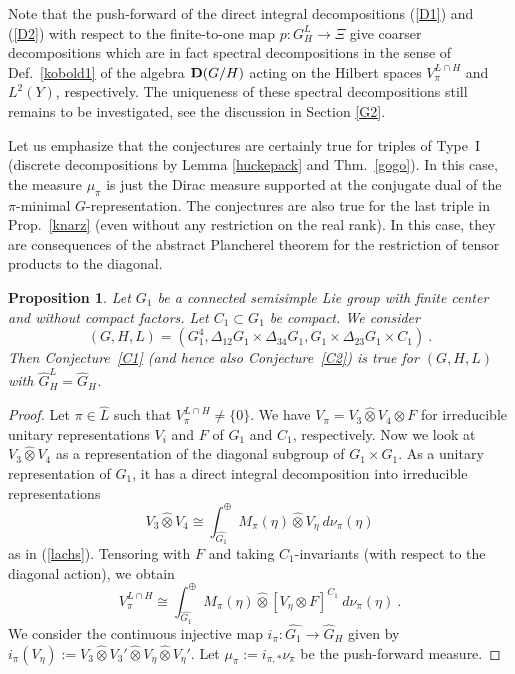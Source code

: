 \documentclass[10]{amsart}
\newtheorem{pro}[thm]{Proposition}
\theoremstyle{remark}
\theoremstyle{definition}
\numberwithin{equation}{section}
\newcommand{\be}{\begin{equation}}
\begin{document}
{Note that the push-forward of the direct integral decompositions (\ref{D1}) and (\ref{D2}) with respect to the  finite-to-one map $p: G_H^L\rightarrow \Xi$ give coarser decompositions
which are in fact spectral decompositions in the sense of Def.~\ref{kobold1} of the algebra ${\bf D}(G/H)$ acting on the Hilbert spaces  $V_\pi^{L\cap H}$ and $L^2(Y)$, respectively.
The uniqueness of these spectral decompositions still remains to be investigated, see the discussion in Section \ref{G2}.

Let us emphasize that the conjectures are certainly true for triples of Type~I (discrete decompositions by Lemma \ref{huckepack} and Thm.~\ref{gogo}).
In this case, the measure $\mu_\pi$ is just the Dirac measure supported at the conjugate dual of the $\pi$-minimal $G$-representation.
The conjectures are also true for the last triple in Prop.~\ref{knarz} (even without any restriction on the real rank). In this case, they are consequences of the abstract Plancherel theorem for the restriction of tensor products to the diagonal.

\begin{pro}\label{last}
Let $G_1$ be a connected semisimple Lie group with finite center and without compact factors. Let $C_1\subset G_1$ be compact. We consider 
$$ (G,H,L)=(G_1^4,\Delta_{12}G_1\times\Delta_{34}G_1,G_1\times \Delta_{23}G_1\times C_1)\ .$$
Then Conjecture~\ref{C1} (and hence also Conjecture~\ref{C2}) is true for $(G,H,L)$ with $\widehat G_H^L=\widehat G_H$.
\end{pro}
\begin{proof}
Let $\pi\in\widehat L$ such that $V_\pi^{L\cap H}\ne\{0\}$. We have $V_\pi=V_3\hat\otimes V_4\otimes F$ for irreducible unitary representations $V_i$ and $F$ of $G_1$ and $C_1$,
respectively. Now we look at $V_3\hat\otimes V_4$ as a representation of the diagonal subgroup of $G_1\times G_1$. As a unitary representation of $G_1$, it has a direct
integral decomposition into irreducible representations
$$  V_3\hat\otimes V_4\cong \int_{\widehat {G_1}}^\oplus M_\pi(\eta)\hat\otimes V_\eta\: d\nu_\pi(\eta)$$
as in (\ref{lachs}). Tensoring with $F$ and taking $C_1$-invariants (with respect to the diagonal action), we obtain
\be\label{klaus2} V_\pi^{L\cap H}\cong \int_{\widehat{G_1}}^\oplus M_\pi(\eta)\hat\otimes [V_\eta\otimes F]^{C_1}\: d\nu_\pi(\eta)\ .
\end{equation}
We consider the continuous injective map $i_\pi: \widehat{G_1}\rightarrow \widehat G_H$ given by $i_\pi (V_\eta):=V_3\hat\otimes V_3'\hat\otimes V_\eta\hat\otimes V_\eta'$.
Let $\mu_\pi:=i_{\pi,*}\nu_\pi$ be the push-forward measure.


\end{proof}}
\end{document}
